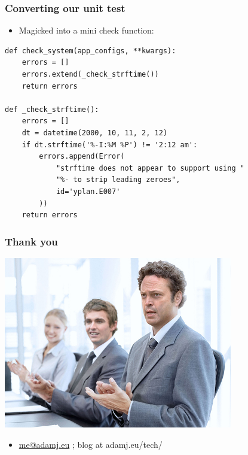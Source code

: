 \documentclass{beamer}
\begin{document}
\begin{frame}[fragile]\frametitle{Converting our unit test}

    \begin{itemize}
        \item Magicked into a mini check function:
    \end{itemize}

    \begin{lstlisting}
def check_system(app_configs, **kwargs):
    errors = []
    errors.extend(_check_strftime())
    return errors

def _check_strftime():
    errors = []
    dt = datetime(2000, 10, 11, 2, 12)
    if dt.strftime('%-I:%M %P') != '2:12 am':
        errors.append(Error(
            "strftime does not appear to support using "
            "%- to strip leading zeroes",
            id='yplan.E007'
        ))
    return errors
    \end{lstlisting}

\end{frame}


\begin{frame}[fragile]\frametitle{Thank you}

    \begin{center}
        \includegraphics[width=10cm]{clapping}
    \end{center}

    \begin{itemize}
        \item \url{me@adamj.eu} ; blog at adamj.eu/tech/
    \end{itemize}

\end{frame}
\end{document}
